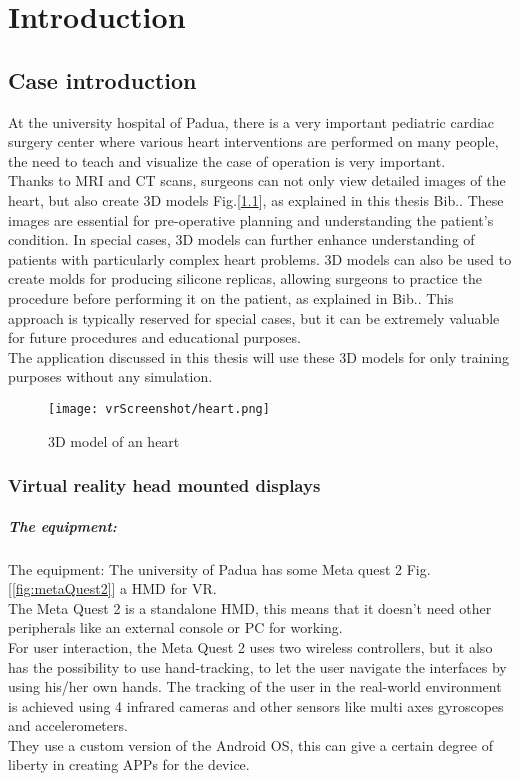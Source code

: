
\chapter{Introduction}
\label{chp:intro}

\section{Case introduction}
\noindent
At the university hospital of Padua, 
there is a very important pediatric cardiac surgery center where various heart interventions are performed on many people,
the need to teach and visualize the case of operation is very important. \\
Thanks to \ac{MRI} and \ac{CT} scans, surgeons can not only view detailed images of the heart, but also create 3D models Fig.[\ref{fig:heart}], as explained in this thesis Bib.\cite{thesisFrancesco}. These images are essential for pre-operative planning and understanding the patient's condition.
In special cases, 3D models can further enhance understanding of patients with particularly complex heart problems.
3D models can also be used to create molds for producing silicone replicas, allowing surgeons to practice the procedure before performing it on the patient, as explained in Bib.\cite{thesisFabio}.
This approach is typically reserved for special cases, but it can be extremely valuable for future procedures and educational purposes.\\
The application discussed in this thesis will use these 3D models for only training purposes without any simulation.\\

\begin{figure}[ht]
  \centering
  \texttt{[image: vrScreenshot/heart.png]}
  \caption{3D model of an heart}
  \label{fig:heart}
\end{figure}
\subsection{Virtual reality head mounted displays}

\paragraph{The equipment:}
The equipment: The university of Padua has some Meta quest 2 Fig.[\ref{fig:metaQuest2}] a \ac{HMD} for \ac{VR}.\\ 
The Meta Quest 2 is a standalone \ac{HMD}, this means that it doesn't need other peripherals like an external console or \ac{PC} for working.\\
For user interaction, the Meta Quest 2 uses two wireless controllers, but it also has the possibility to use hand-tracking, to let the user navigate the interfaces by using his/her own hands.
The tracking of the user in the real-world environment is achieved using 4 infrared cameras and other sensors like multi axes gyroscopes and accelerometers.\\
They use a custom version of the Android \ac{OS}, this can give a certain degree of liberty in creating APPs for the device.

